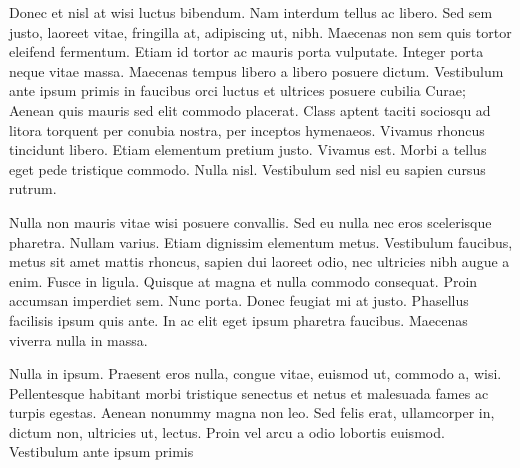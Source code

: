 \documentclass[AMS,STIX2COL]{WileyNJD-v2}
\begin{document}
    Donec et nisl at wisi luctus bibendum. Nam interdum tellus ac libero. Sed sem justo, laoreet vitae, fringilla at,
    adipiscing ut, nibh. Maecenas non sem quis tortor eleifend fermentum. Etiam id tortor ac mauris porta vulputate.
    Integer porta neque vitae massa. Maecenas tempus libero a libero posuere dictum. Vestibulum ante ipsum primis in
    faucibus orci luctus et ultrices posuere cubilia Curae; Aenean quis mauris sed elit commodo placerat. Class aptent
    taciti sociosqu ad litora torquent per conubia nostra, per inceptos hymenaeos. Vivamus rhoncus tincidunt libero.
    Etiam elementum pretium justo. Vivamus est. Morbi a tellus eget pede tristique commodo. Nulla nisl. Vestibulum
    sed nisl eu sapien cursus rutrum.

    Nulla non mauris vitae wisi posuere convallis. Sed eu nulla nec eros scelerisque pharetra. Nullam varius. Etiam
    dignissim elementum metus. Vestibulum faucibus, metus sit amet mattis rhoncus, sapien dui laoreet odio, nec ultricies
    nibh augue a enim. Fusce in ligula. Quisque at magna et nulla commodo consequat. Proin accumsan imperdiet sem.
    Nunc porta. Donec feugiat mi at justo. Phasellus facilisis ipsum quis ante. In ac elit eget ipsum pharetra faucibus.
    Maecenas viverra nulla in massa.

    Nulla in ipsum. Praesent eros nulla, congue vitae, euismod ut, commodo a, wisi. Pellentesque habitant morbi
    tristique senectus et netus et malesuada fames ac turpis egestas. Aenean nonummy magna non leo. Sed felis erat,
    ullamcorper in, dictum non, ultricies ut, lectus. Proin vel arcu a odio lobortis euismod. Vestibulum ante ipsum primis
\end{document}
